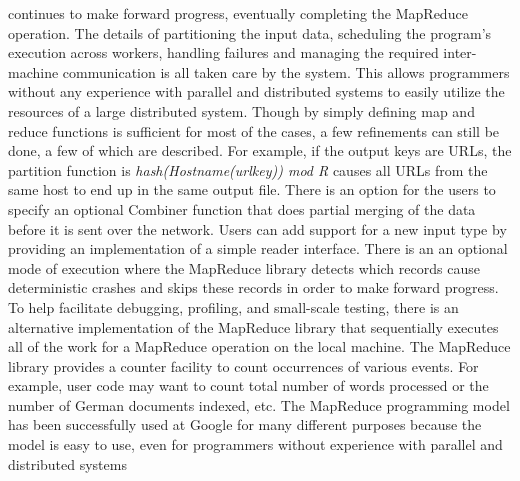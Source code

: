 \documentclass[11pt]{article}
\begin{document}
continues to make forward progress, eventually completing the MapReduce operation. The details of partitioning the input data, scheduling the program’s execution across workers, handling failures and managing the required inter-machine communication is all taken care by the system. This allows programmers without any experience with parallel and distributed systems to easily utilize the resources of a large distributed system. Though by simply defining map and reduce functions is sufficient for most of the cases, a few refinements can still be done, a few of which are described. For example, if the output keys are URLs, the partition function is \textit{hash(Hostname(urlkey)) mod R} causes all URLs  from the same host to end up in the same output file. There is an option for the users to specify an optional Combiner function that does partial merging of the data before it is sent over the network. Users can add support for a new input type by providing an implementation of a simple reader interface. There is an an optional mode of execution where the MapReduce library detects which records cause deterministic crashes and skips these records in order to make forward progress. To help facilitate debugging, profiling, and
small-scale testing, there is an alternative implementation of the MapReduce library that sequentially executes all of the work for a MapReduce operation on
the local machine. The MapReduce library provides a counter facility to
count occurrences of various events. For example, user code may want to count total number of words processed or the number of German documents indexed, etc. The MapReduce programming model has been successfully used at Google for many different purposes because the model is easy to use, even for programmers without experience with parallel and distributed systems
\end{document}
